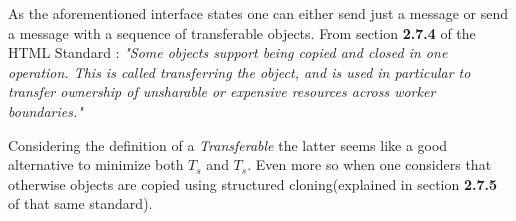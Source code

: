 As the aforementioned interface states one can either send just a message or send a message with a sequence of transferable objects. From section \textbf{2.7.4} of the HTML Standard \cite{html}:
\textit{"Some objects support being copied and closed in one operation. This is called transferring the object, and is used in particular to transfer ownership of unsharable or expensive resources across worker boundaries."}

Considering the definition of a \textit{Transferable} the latter seems like a good alternative to minimize both \(T_{s}\) and \(T_{s}\). Even more so when one considers that otherwise objects are copied using structured cloning(explained in section \textbf{2.7.5} of that same standard).

\pagebreak